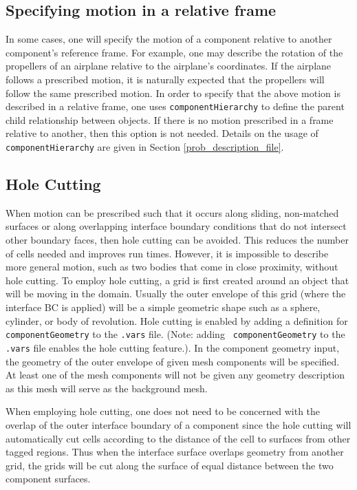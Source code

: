 \documentclass{article}
\begin{document}
\subsection{Specifying motion in a relative frame}

In some cases, one will specify the motion of a component relative to
another component's reference frame.  For example, one may describe the
rotation of the propellers of an airplane relative to the airplane's
coordinates.  If the airplane follows a prescribed motion, it is
naturally expected that the propellers will follow the same prescribed
motion.  In order to specify that the above motion is described in a
relative frame, one uses {\tt componentHierarchy} to define the
parent child relationship between objects.  If there is no motion
prescribed in a frame relative to another, then this option is not
needed.  Details on the usage of {\tt componentHierarchy} are given in
Section \ref{prob_description_file}.

\subsection{Hole Cutting}

When motion can be prescribed such that it occurs along sliding,
non-matched surfaces or along overlapping interface boundary
conditions that do not intersect other boundary faces, then hole
cutting can be avoided.  This reduces the number of cells needed and
improves run times.  However, it is impossible to describe more
general motion, such as two bodies that come in close proximity,
without hole cutting.  To employ hole cutting, a grid is first created
around an object that will be moving in the domain.  Usually the outer
envelope of this grid (where the interface BC is applied) will be a
simple geometric shape such as a sphere, cylinder, or body of
revolution.  Hole cutting is enabled by adding a definition for {\tt
  componentGeometry} to the {\tt .vars} file. (Note: adding {\tt
  componentGeometry} to the {\tt .vars} file enables the hole cutting
feature.).  In the component geometry input, the geometry of the outer
envelope of given mesh components will be specified.  At least one of
the mesh components will not be given any geometry description as this
mesh will serve as the background mesh.

When employing hole cutting, one does not need to be concerned
with the overlap of the outer interface boundary of a component since
the hole cutting will automatically cut cells according to the
distance of the cell to surfaces from other tagged regions.  Thus
when the interface surface overlaps geometry from another grid, the
grids will be cut along the surface of equal distance between the two
component surfaces.
\end{document}
